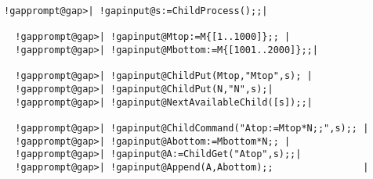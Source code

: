 \documentclass[a4paper,11pt]{report}
\begin{document}
{{\begin{Verbatim}[commandchars=!@|,fontsize=\small,frame=single,label=Example]
  !gapprompt@gap>| !gapinput@s:=ChildProcess();;|
  
  !gapprompt@gap>| !gapinput@Mtop:=M{[1..1000]};; |
  !gapprompt@gap>| !gapinput@Mbottom:=M{[1001..2000]};;|
  
  !gapprompt@gap>| !gapinput@ChildPut(Mtop,"Mtop",s); |
  !gapprompt@gap>| !gapinput@ChildPut(N,"N",s);|
  !gapprompt@gap>| !gapinput@NextAvailableChild([s]);;|
  
  !gapprompt@gap>| !gapinput@ChildCommand("Atop:=Mtop*N;;",s);; |
  !gapprompt@gap>| !gapinput@Abottom:=Mbottom*N;; |
  !gapprompt@gap>| !gapinput@A:=ChildGet("Atop",s);;|
  !gapprompt@gap>| !gapinput@Append(A,Abottom);;                |
  
\end{Verbatim}
 }

 }

 
\end{document}
